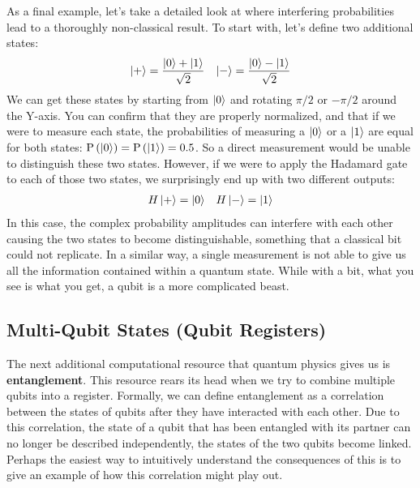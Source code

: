 As a final example, let's take a detailed look at where interfering probabilities lead to a thoroughly
non-classical result. To start with, let's define two additional states:
\begin{align}
  \ket{+} = \frac{\ket{0} + \ket{1}}{\sqrt{2}} && \ket{-} = \frac{\ket{0} - \ket{1}}{\sqrt{2}}
\end{align}
We can get these states by starting from $\ket{0}$ and rotating $\pi/2$ or $-\pi/2$ around the Y-axis. You can
confirm that they are properly normalized, and that if we were to measure each state, the
probabilities of measuring a $\ket{0}$ or a $\ket{1}$ are equal for both states: $\mathrm{P}\left(\ket{0}\right) =
\mathrm{P}\left(\ket{1}\right) = 0.5$. So a direct measurement would be unable to distinguish these two states.
However, if we were to apply the Hadamard gate to each of those two states, we surprisingly end up with two
different outputs:
\begin{align}
  H\ket{+} = \ket{0} && H\ket{-} = \ket{1}
\end{align}
In this case, the complex probability amplitudes can interfere with each other causing the two states to
become distinguishable, something that a classical bit could not replicate. In a similar way, a single measurement
is not able to give us all the information contained within a quantum state. While with a bit, what you see is what
you get, a qubit is a more complicated beast.

\subsection{Multi-Qubit States (Qubit Registers)}
The next additional computational resource that quantum physics gives us is \textbf{entanglement}. This
resource rears its head when we try to combine multiple qubits into a register. Formally,
we can define entanglement as a correlation between the states of qubits after they have interacted
with each other. Due to this correlation, the state of a qubit that has been entangled with its partner
can no longer be described independently, the states of the two qubits become linked. Perhaps the easiest
way to intuitively understand the consequences of this is to give an example of how this correlation might play out.

